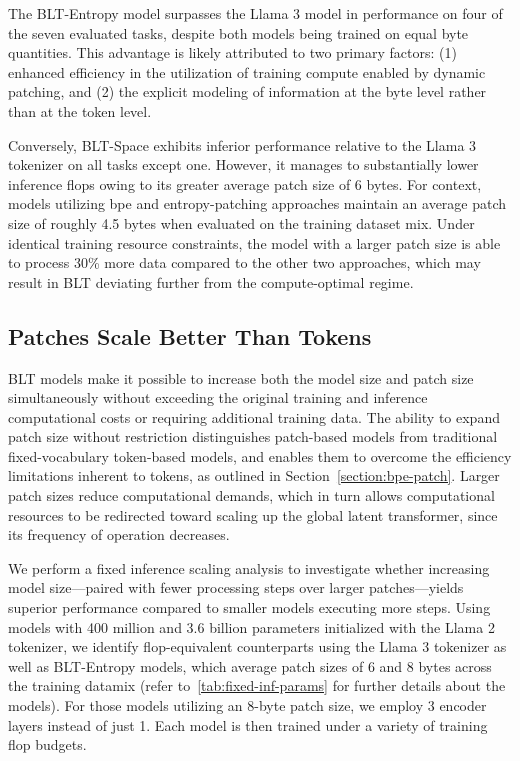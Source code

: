 The {\textsc BLT}-Entropy model surpasses the Llama 3 model in performance on four of the seven evaluated tasks, despite both models being trained on equal byte quantities. This advantage is likely attributed to two primary factors: (1) enhanced efficiency in the utilization of training compute enabled by dynamic patching, and (2) the explicit modeling of information at the byte level rather than at the token level.

Conversely, {\textsc BLT}-Space exhibits inferior performance relative to the Llama 3 tokenizer on all tasks except one. However, it manages to substantially lower inference flops owing to its greater average patch size of 6 bytes. For context, models utilizing bpe and entropy-patching approaches maintain an average patch size of roughly 4.5 bytes when evaluated on the training dataset mix. Under identical training resource constraints, the model with a larger patch size is able to process 30\% more data compared to the other two approaches, which may result in {\textsc BLT} deviating further from the compute-optimal regime.

\subsection{Patches Scale Better Than Tokens} {\textsc BLT} models make it possible to increase both the model size and patch size simultaneously without exceeding the original training and inference computational costs or requiring additional training data. The ability to expand patch size without restriction distinguishes patch-based models from traditional fixed-vocabulary token-based models, and enables them to overcome the efficiency limitations inherent to tokens, as outlined in Section~\ref{section:bpe-patch}. Larger patch sizes reduce computational demands, which in turn allows computational resources to be redirected toward scaling up the global latent transformer, since its frequency of operation decreases.

We perform a fixed inference scaling analysis to investigate whether increasing model size—paired with fewer processing steps over larger patches—yields superior performance compared to smaller models executing more steps. Using models with 400 million and 3.6 billion parameters initialized with the Llama 2 tokenizer, we identify flop-equivalent counterparts using the Llama 3 tokenizer as well as {\textsc BLT}-Entropy models, which average patch sizes of 6 and 8 bytes across the training datamix (refer to~\autoref{tab:fixed-inf-params} for further details about the models). For those models utilizing an 8-byte patch size, we employ 3 encoder layers instead of just 1. Each model is then trained under a variety of training flop budgets.

